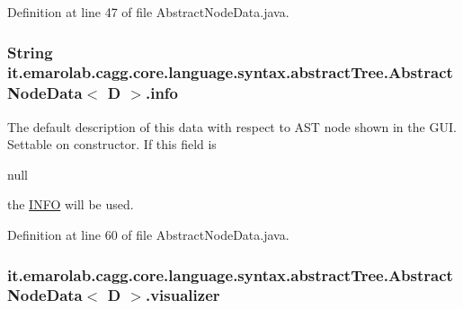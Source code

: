 Definition at line 47 of file Abstract\-Node\-Data.\-java.

\hypertarget{classit_1_1emarolab_1_1cagg_1_1core_1_1language_1_1syntax_1_1abstractTree_1_1AbstractNodeData_3_01D_01_4_acf41532cee5b85597c2407c95f6c1e6f}{
\subsubsection[{info}]{\setlength{\rightskip}{0pt plus 5cm}String it.\-emarolab.\-cagg.\-core.\-language.\-syntax.\-abstract\-Tree.\-Abstract\-Node\-Data$<$ D $>$.info\hspace{0.3cm}{\ttfamily [protected]}}}\label{classit_1_1emarolab_1_1cagg_1_1core_1_1language_1_1syntax_1_1abstractTree_1_1AbstractNodeData_3_01D_01_4_acf41532cee5b85597c2407c95f6c1e6f}
The default description of this data with respect to A\-S\-T node shown in the G\-U\-I. Settable on constructor. If this field is
\begin{DoxyCode}
null 
\end{DoxyCode}
 the \hyperlink{classit_1_1emarolab_1_1cagg_1_1core_1_1language_1_1syntax_1_1abstractTree_1_1AbstractNodeData_3_01D_01_4_a6b6418feff55aa92262b82c78b008e77}{I\-N\-F\-O} will be used. 

Definition at line 60 of file Abstract\-Node\-Data.\-java.

\hypertarget{classit_1_1emarolab_1_1cagg_1_1core_1_1language_1_1syntax_1_1abstractTree_1_1AbstractNodeData_3_01D_01_4_a949280b3bc320e3b0e8be653bd162e0d}{
\subsubsection[{visualizer}]{ it.\-emarolab.\-cagg.\-core.\-language.\-syntax.\-abstract\-Tree.\-Abstract\-Node\-Data$<$ D $>$.visualizer\hspace{0.3cm}{\ttfamily [private]}}}\label{classit_1_1emarolab_1_1cagg_1_1core_1_1language_1_1syntax_1_1abstractTree_1_1AbstractNodeData_3_01D_01_4_a949280b3bc320e3b0e8be653bd162e0d}


